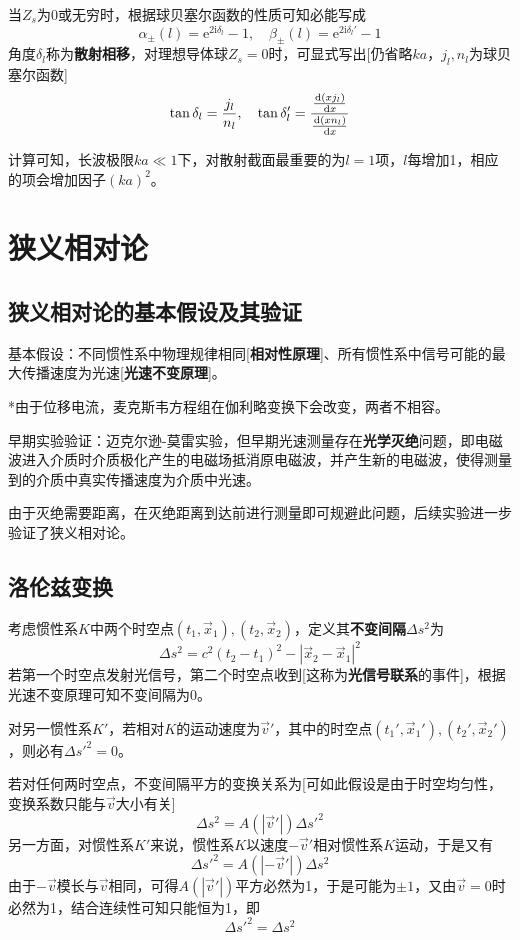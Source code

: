 \documentclass[a4paper,UTF8,fontset=windows]{ctexart}
\newcommand*{\dr}{\hspace{0.07em}\mathrm{d}}
\newcommand*{\er}{\mathrm{e}}
\newcommand*{\ir}{\mathrm{i}}
\newcommand*{\vvs}{\vec{v}}
\newcommand*{\vx}{\vec{x}}
\newcommand*{\dt}[2][t]{\frac{\dr #2}{\dr #1}}
\begin{document}
当$Z_s$为0或无穷时，根据球贝塞尔函数的性质可知必能写成
$$\alpha_\pm(l)=\er^{2\ir\delta_l}-1,\quad\beta_\pm(l)=\er^{2\ir\delta_l'}-1$$
角度$\delta_l$称为\textbf{散射相移}，对理想导体球$Z_s=0$时，可显式写出[仍省略$ka$，$j_l,n_l$为球贝塞尔函数]
$$\tan\delta_l=\frac{j_l}{n_l},\quad\tan\delta_l'=\frac{\dt[x]{(xj_l)}}{\dt[x]{(xn_l)}}$$

计算可知，长波极限$ka\ll1$下，对散射截面最重要的为$l=1$项，$l$每增加1，相应的项会增加因子$(ka)^2$。

\section{狭义相对论}
\subsection{狭义相对论的基本假设及其验证}
基本假设：不同惯性系中物理规律相同[\textbf{相对性原理}]、所有惯性系中信号可能的最大传播速度为光速[\textbf{光速不变原理}]。

*由于位移电流，麦克斯韦方程组在伽利略变换下会改变，两者不相容。

早期实验验证：迈克尔逊-莫雷实验，但早期光速测量存在\textbf{光学灭绝}问题，即电磁波进入介质时介质极化产生的电磁场抵消原电磁波，并产生新的电磁波，使得测量到的介质中真实传播速度为介质中光速。

由于灭绝需要距离，在灭绝距离到达前进行测量即可规避此问题，后续实验进一步验证了狭义相对论。

\subsection{洛伦兹变换}
考虑惯性系$K$中两个时空点$(t_1,\vx_1),(t_2,\vx_2)$，定义其\textbf{不变间隔}$\Delta s^2$为
$$\Delta s^2=c^2(t_2-t_1)^2-|\vx_2-\vx_1|^2$$
若第一个时空点发射光信号，第二个时空点收到[这称为\textbf{光信号联系}的事件]，根据光速不变原理可知不变间隔为0。

对另一惯性系$K'$，若相对$K$的运动速度为$\vvs'$，其中的时空点$(t_1',\vx_1'),(t_2',\vx_2')$，则必有$\Delta s'^2=0$。

若对任何两时空点，不变间隔平方的变换关系为[可如此假设是由于时空均匀性，变换系数只能与$\vvs$大小有关]
$$\Delta s^2=A(|\vvs'|){\Delta s'}^2$$
另一方面，对惯性系$K'$来说，惯性系$K$以速度$-\vvs'$相对惯性系$K$运动，于是又有
$${\Delta s'}^2=A(|-\vvs'|)\Delta s^2$$
由于$-\vvs$模长与$\vvs$相同，可得$A(|\vvs'|)$平方必然为1，于是可能为$\pm1$，又由$\vvs=0$时必然为1，结合连续性可知只能恒为1，即
$${\Delta s'}^2=\Delta s^2$$
\end{document}
